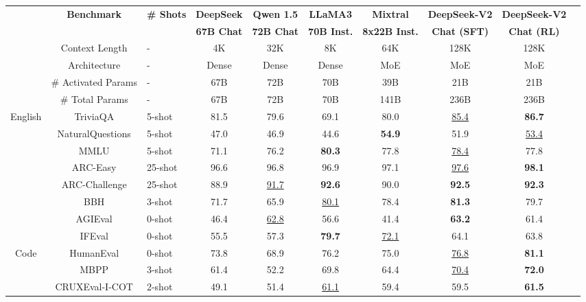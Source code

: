\begin{table}[!t]
    \centering
    \footnotesize
    \setlength{\tabcolsep}{2pt}
    \begin{tabular}{@{}c c l c | cc c |c c c@{}}
    \toprule
    & \multirow{2}{*}{\centering \textbf{Benchmark}} & \multirow{2}{*}{\textbf{\# Shots}} & \textbf{DeepSeek} & \textbf{Qwen 1.5} & \textbf{LLaMA3} & \textbf{Mixtral} & \textbf{DeepSeek-V2} & \textbf{DeepSeek-V2} \\
    & & & \textbf{67B Chat} & \textbf{72B Chat} & \textbf{70B Inst.} & \textbf{8x22B Inst.} & \textbf{Chat (SFT)} & \textbf{Chat (RL)} \\
    \midrule
    & Context Length & - & 4K & 32K & 8K & 64K & 128K & 128K\\
    & Architecture & - & Dense & Dense & Dense & MoE & MoE & MoE\\
    & \# Activated Params & - & 67B & 72B & 70B & 39B & 21B & 21B \\
    & \# Total Params & - & 67B & 72B & 70B & 141B & 236B & 236B \\
    \midrule
    \multirow{8}{*}{English} & TriviaQA & 5-shot & 81.5 & 79.6 & 69.1 & 80.0 & \underline{85.4} & \textbf{86.7} \\
    & NaturalQuestions & 5-shot & 47.0 & 46.9 & 44.6 & \textbf{54.9} & 51.9 & \underline{53.4} \\
    & MMLU & 5-shot & 71.1 & 76.2 & \textbf{80.3} & 77.8 & \underline{78.4} & 77.8 \\
    & ARC-Easy & 25-shot & 96.6 & 96.8 & 96.9 & 97.1 & \underline{97.6} &  \textbf{98.1} \\
    & ARC-Challenge & 25-shot & 88.9 & \underline{91.7} & \textbf{92.6} & 90.0 & \textbf{92.5} & \textbf{92.3} \\
    & BBH & 3-shot & 71.7 & 65.9 & \underline{80.1} & 78.4 & \textbf{81.3} & 79.7 \\
    & AGIEval & 0-shot & 46.4 & \underline{62.8} & 56.6 & 41.4 & \textbf{63.2} & 61.4 \\
    & IFEval & 0-shot & 55.5 & 57.3 & \textbf{79.7} & \underline{72.1} & 64.1 & 63.8 \\
    \midrule
    \multirow{4}{*}{Code} & HumanEval & 0-shot & 73.8 & 68.9 & 76.2 & 75.0 & \underline{76.8} & \textbf{81.1} \\
    & MBPP & 3-shot & 61.4 & 52.2 & 69.8 & 64.4 & \underline{70.4} & \textbf{72.0} \\
    & CRUXEval-I-COT & 2-shot & 49.1 & 51.4 & \underline{61.1} & 59.4 & 59.5 & \textbf{61.5} \\

\end{tabular}
\end{table}
